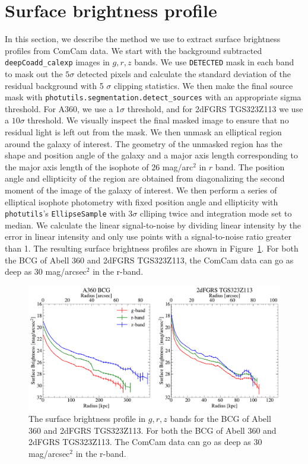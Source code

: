 \documentclass[SE,lsstdraft,authoryear,toc]{lsstdoc}
\begin{document}
\section{Surface brightness profile}
In this section, we describe the method we use to extract surface brightness profiles from ComCam data. We start with the background subtracted \texttt{deepCoadd\_calexp} images in $g, r, z$ bands. We use \texttt{DETECTED} mask in each band to mask out the $5 \sigma$ detected pixels and calculate the standard deviation of the residual background with 5 $\sigma$ clipping statistics. We then make the final source mask with \texttt{photutils.segmentation.detect\_sources} with an appropriate sigma threshold. For A360, we use a 1$\sigma$ threshold, and for 2dFGRS TGS323Z113 we use a $10 \sigma$ threshold. We visually inspect the final masked image to ensure that no residual light is left out from the mask. We then unmask an elliptical region around the galaxy of interest. The geometry of the unmasked region has the shape and position angle of the galaxy and a major axis length corresponding to the major axis length of the isophote of 26 mag/arc$^2$ in $r$ band. The position angle and ellipticity of the region are obtained from diagonalizing the second moment of the image of the galaxy of interest. We then perform a series of elliptical isophote photometry with fixed position angle and ellipticity with \texttt{photutils}'s \texttt{EllipseSample} with $3 \sigma$ clliping twice and integration mode set to median. We calculate the linear signal-to-noise by dividing linear intensity by the error in linear intensity and only use points with a signal-to-noise ratio greater than 1. The resulting surface brightness profiles are shown in Figure~\ref{fig:sb}. For both the BCG of Abell 360 and 2dFGRS TGS323Z113, the ComCam data can go as deep as 30 mag/arcsec$^2$ in the r-band.


\begin{figure}[htbp]
  \centering
  \includegraphics[width=1.0\linewidth]{figures/sb.pdf}
  \caption{The surface brightness profile in $g, r, z$ bands for the BCG of Abell 360 and 2dFGRS TGS323Z113. For both the BCG of Abell 360 and 2dFGRS TGS323Z113. The ComCam data can go as deep as 30 mag/arcsec$^2$ in the r-band.}
  \label{fig:sb}
\end{figure}
\end{document}
